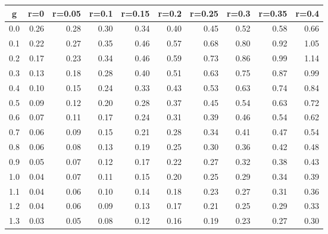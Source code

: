 %
\begin{table}[!tbp]
 \begin{center}
 \begin{tabular}{rrrrrrrrrr}\hline\hline
\multicolumn{1}{c}{g}&\multicolumn{1}{c}{r=0}&\multicolumn{1}{c}{r=0.05}&\multicolumn{1}{c}{r=0.1}&\multicolumn{1}{c}{r=0.15}&\multicolumn{1}{c}{r=0.2}&\multicolumn{1}{c}{r=0.25}&\multicolumn{1}{c}{r=0.3}&\multicolumn{1}{c}{r=0.35}&\multicolumn{1}{c}{r=0.4}\tabularnewline
\hline
0.0&0.26&0.28&0.30&0.34&0.40&0.45&0.52&0.58&0.66\tabularnewline
0.1&0.22&0.27&0.35&0.46&0.57&0.68&0.80&0.92&1.05\tabularnewline
0.2&0.17&0.23&0.34&0.46&0.59&0.73&0.86&0.99&1.14\tabularnewline
0.3&0.13&0.18&0.28&0.40&0.51&0.63&0.75&0.87&0.99\tabularnewline
0.4&0.10&0.15&0.24&0.33&0.43&0.53&0.63&0.74&0.84\tabularnewline
0.5&0.09&0.12&0.20&0.28&0.37&0.45&0.54&0.63&0.72\tabularnewline
0.6&0.07&0.11&0.17&0.24&0.31&0.39&0.46&0.54&0.62\tabularnewline
0.7&0.06&0.09&0.15&0.21&0.28&0.34&0.41&0.47&0.54\tabularnewline
0.8&0.06&0.08&0.13&0.19&0.25&0.30&0.36&0.42&0.48\tabularnewline
0.9&0.05&0.07&0.12&0.17&0.22&0.27&0.32&0.38&0.43\tabularnewline
1.0&0.04&0.07&0.11&0.15&0.20&0.25&0.29&0.34&0.39\tabularnewline
1.1&0.04&0.06&0.10&0.14&0.18&0.23&0.27&0.31&0.36\tabularnewline
1.2&0.04&0.06&0.09&0.13&0.17&0.21&0.25&0.29&0.33\tabularnewline
1.3&0.03&0.05&0.08&0.12&0.16&0.19&0.23&0.27&0.30\tabularnewline
\hline
\end{tabular}

\end{center}

\end{table}

